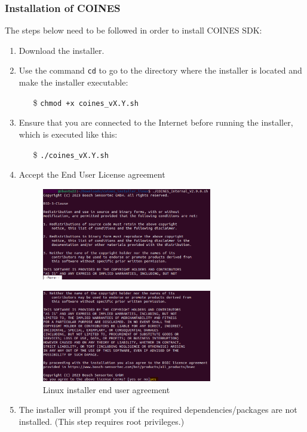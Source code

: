 \documentclass[11pt,headings=small]{scrartcl}
\begin{document}
\subsubsection{Installation of COINES}
The steps below need to be followed in order to install COINES SDK:
\begin{enumerate}
	\item Download the installer.
	\item Use the command \texttt{cd} to go to the directory where the installer is located and make the installer executable:
	\begin{itemize}
		\item[\$] \texttt{chmod +x coines\_vX.Y.sh}
	\end{itemize}
	\item Ensure that you are connected to the Internet before running the installer, which is executed like this:
	\begin{itemize}
	\item[\$] \texttt{./coines\_vX.Y.sh}
	\end{itemize}	
	\item Accept the End User License agreement
	\begin{figure}[H]
		\begin{center}
			\includegraphics[width=0.7\textwidth]{coinesAPI_images/Linux_installation_user_agreement.png}
		\end{center}
	\end{figure}
	\begin{figure}[H]
		\begin{center}
			\includegraphics[width=0.7\textwidth]{coinesAPI_images/Linux_installation_user_agreement_1.png}
			\caption{Linux installer end user agreement}
		\end{center}
	\end{figure}
	\item The installer will prompt you if the required dependencies/packages are not installed. (This step requires root privileges.)
\end{enumerate}
\end{document}
